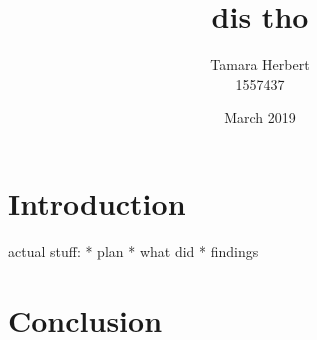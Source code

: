 \documentclass{article}
\title{dis tho}
\author{Tamara Herbert \\ 1557437}
\date{March 2019}
\begin{document}
\maketitle

\tableofcontents

\pagebreak

\section{Introduction}

% 



actual stuff:
	* plan
	* what did
	* findings



\section{Conclusion}




\end{document}
